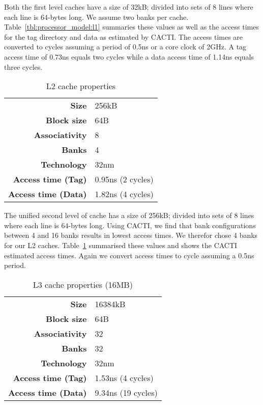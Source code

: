 Both the first level caches have a size of 32kB; divided into sets of 8 lines where each line is 64-bytes long. 
We assume two banks per cache. 
Table~\ref{tbl:processor_model:l1} summaries these values as well as the access times for the tag directory and data as estimated by CACTI. 
The access times are converted to cycles assuming a period of 0.5ns or a core clock of 2GHz. 
A tag access time of 0.73ns equals two cycles while a data access time of 1.14ns equals three cycles.

\begin{table}[ht]
\centering
\begin{tabular}{rl}
\toprule
\bf{Size}               & 256kB             \\
\bf{Block size}         & 64B               \\
\bf{Associativity}      & 8                 \\
\bf{Banks}              & 4                 \\
\bf{Technology}         & 32nm              \\
\bf{Access time (Tag)}  & 0.95ns (2 cycles) \\
\bf{Access time (Data)} & 1.82ns (4 cycles) \\
\bottomrule
\end{tabular}
\caption{L2 cache properties}
\label{tbl:processor_model:l2}
\end{table}

The unified second level of cache has a size of 256kB; divided into sets of 8 lines where each line is 64-bytes long.
Using CACTI, we find that bank configurations between 4 and 16 banks results in lowest access times. We therefor chose 4 banks for our L2 caches.
Table~\ref{tbl:processor_model:l2} summarised these values and shows the CACTI estimated access times. 
Again we convert access times to cycle assuming a 0.5ns period.

\begin{table}[ht]
\centering
\begin{tabular}{rl}
\toprule
\bf{Size}               & 16384kB            \\
\bf{Block size}         & 64B                \\
\bf{Associativity}      & 32                 \\
\bf{Banks}              & 32                 \\
\bf{Technology}         & 32nm               \\
\bf{Access time (Tag)}  & 1.53ns (4 cycles)  \\
\bf{Access time (Data)} & 9.34ns (19 cycles) \\
\bottomrule
\end{tabular}
\caption{L3 cache properties (16MB)}
\label{tbl:processor_model:l3}
\end{table}

